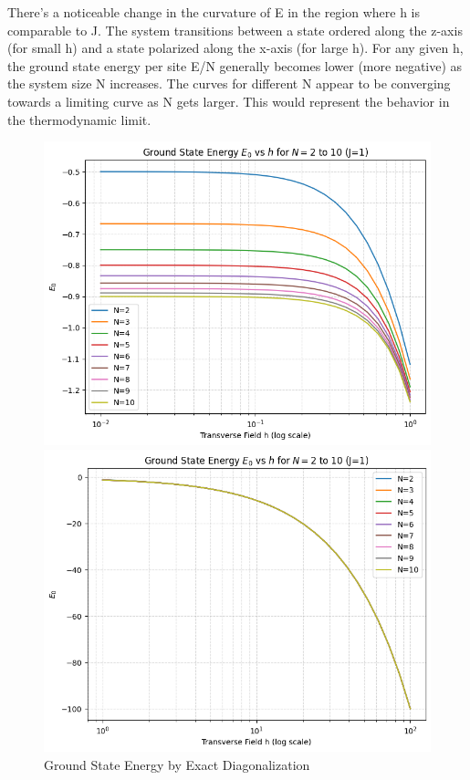 \documentclass[a4paper]{article}
\begin{document}
There's a noticeable change in the curvature of E in the region where h is comparable to J. The system transitions between a state ordered along the z-axis (for small h) and a state polarized along the x-axis (for large h). For any given h, the ground state energy per site E/N generally becomes lower (more negative) as the system size N increases. The curves for different N appear to be converging towards a limiting curve as N gets larger. This would represent the behavior in the thermodynamic limit. 
\begin{figure}[htbp]
    \centering
    \begin{minipage}{0.48\textwidth}
        \centering
        \includegraphics[width=\linewidth]{images/E_0_dia.png} %
    \end{minipage}\hfill %
    \begin{minipage}{0.48\textwidth}
        \centering
        \includegraphics[width=\linewidth]{images/E_0_dia_1.png} %
    \end{minipage}
    \caption{Ground State Energy by Exact Diagonalization}
    \label{7}
\end{figure}
\end{document}
